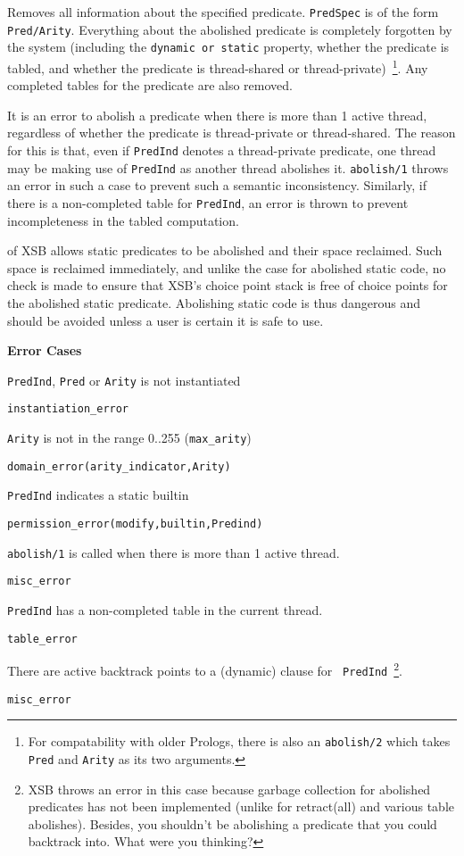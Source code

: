\begin{description}
 Removes all
information about the specified predicate. {\tt PredSpec} is of the
form {\tt Pred/Arity}.  Everything about the abolished predicate is
completely forgotten by the system (including the {\tt dynamic or
  static} property, whether the predicate is tabled, and whether the
predicate is thread-shared or thread-private)~\footnote{For
  compatability with older Prologs, there is also an {\tt abolish/2}
  which takes {\tt Pred} and {\tt Arity} as its two arguments.}.  Any
completed tables for the predicate are also removed.

It is an error to abolish a predicate when there is more than 1 active
thread, regardless of whether the predicate is thread-private or
thread-shared.  The reason for this is that, even if {\tt PredInd}
denotes a thread-private predicate, one thread may be making use of
{\tt PredInd} as another thread abolishes it.  {\tt abolish/1} throws
an error in such a case to prevent such a semantic inconsistency.
Similarly, if there is a non-completed table for {\tt PredInd}, an
error is thrown to prevent incompleteness in the tabled computation.

\compatability \version{} of XSB allows static predicates to be
abolished and their space reclaimed.  Such space is reclaimed
immediately, and unlike the case for abolished static code,  no check
is made to ensure that XSB's choice point stack is free of choice
points for the abolished static predicate.  Abolishing static code is
thus dangerous and should be avoided unless a user is certain it is
safe to use.

{\bf Error Cases}
\bi
\item 	{\tt PredInd}, {\tt Pred} or {\tt Arity} is not instantiated
\bi
\item 	{\tt instantiation\_error}
\ei
%
\item 	{\tt Arity} is not in the range 0..255 ({\tt max\_arity})
\bi
\item 	{\tt domain\_error(arity\_indicator,Arity)}
\ei
%
\item 	{\tt PredInd} indicates a static builtin
\bi
\item 	{\tt permission\_error(modify,builtin,Predind)}
\ei
%
\item {\tt abolish/1} is called when there is more than 1 active thread.
\bi
\item {\tt misc\_error}
\ei
%
\item {\tt PredInd} has a non-completed table in the current thread.
\bi
\item {\tt table\_error}
\ei
%
\item There are active backtrack points to a (dynamic) clause for {\tt
  PredInd}~\footnote{XSB throws an error in this case because garbage
  collection for abolished predicates has not been implemented
  (unlike for retract(all) and various table abolishes).  Besides, you
  shouldn't be abolishing a predicate that you could backtrack into.
  What were you thinking?}. 
\bi
\item {\tt misc\_error}
\ei
%
\ei


\end{description}
